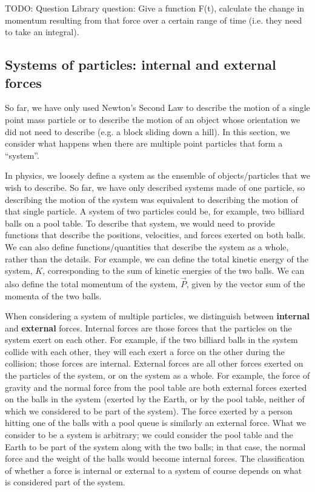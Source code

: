 TODO: Question Library question: Give a function F(t), calculate the change in momentum resulting from that force over a certain range of time (i.e. they need to take an integral). 

\subsection{Systems of particles: internal and external forces}
So far, we have only used Newton's Second Law to describe the motion of a single point mass particle or to describe the motion of an object whose orientation we did not need to describe (e.g. a block sliding down a hill). In this section, we consider what happens when there are multiple point particles that form a ``system''.

In physics, we loosely define a system as the ensemble of objects/particles that we wish to describe. So far, we have only described systems made of one particle, so describing the motion of the system was equivalent to describing the motion of that single particle. A  system of two particles could be, for example, two billiard balls on a pool table. To describe that system, we would need to provide functions that describe the positions, velocities, and forces exerted on both balls. We can also define functions/quantities that describe the system as a whole, rather than the details. For example, we can define the total kinetic energy of the system, $K$, corresponding to the sum of kinetic energies of the two balls. We can also define the total momentum of the system, $\vec P$, given by the vector sum of the momenta of the two balls.

When considering a system of multiple particles, we distinguish between \textbf{internal} and \textbf{external} forces. Internal forces are those forces that the particles on the system exert on each other. For example, if the two billiard balls in the system collide with each other, they will each exert a force on the other during the collision; those forces are internal. External forces are all other forces exerted on the particles of the system, or on the system as a whole. For example, the force of gravity and the normal force from the pool table are both external forces exerted on the balls in the system (exerted by the Earth, or by the pool table, neither of which we considered to be part of the system). The force exerted by a person hitting one of the balls with a pool queue is similarly an external force. What we consider to be a system is arbitrary; we could consider the pool table and the Earth to be part of the system along with the two balls; in that case, the normal force and the weight of the balls would become internal forces. The classification of whether a force is internal or external to a system of course depends on what is considered part of the system.

